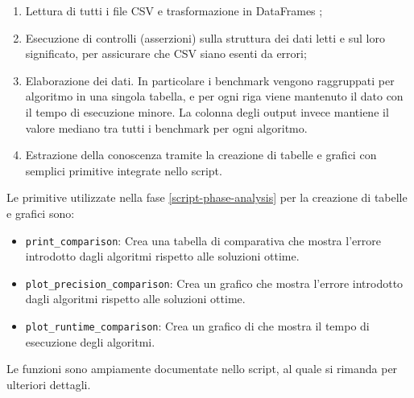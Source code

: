 \begin{enumerate}
    \item Lettura di tutti i file CSV e trasformazione in DataFrames ;
    \item Esecuzione di controlli (asserzioni) sulla struttura dei dati
      letti e sul loro significato, per assicurare che CSV siano esenti da errori;
    \item Elaborazione dei dati. In particolare i benchmark vengono raggruppati
      per algoritmo in una singola tabella, e per ogni riga
      viene mantenuto il dato con il tempo di esecuzione minore. La
      colonna degli output invece mantiene il valore mediano tra tutti
      i benchmark per ogni algoritmo.
    \item Estrazione della conoscenza tramite la creazione di tabelle
      e grafici con semplici primitive integrate nello script.
    \label{script-phase-analysis}
\end{enumerate}

\noindent Le primitive utilizzate nella fase
\ref{script-phase-analysis} per la creazione di tabelle e grafici
sono:

\begin{itemize}
    \item \texttt{print_comparison}: Crea una tabella di
      comparativa che mostra l'errore introdotto dagli algoritmi rispetto alle soluzioni ottime.

    \item \texttt{plot_precision_comparison}: Crea un
      grafico che mostra l'errore introdotto dagli algoritmi rispetto alle soluzioni ottime.

    \item \texttt{plot_runtime_comparison}: Crea un
      grafico di che mostra il tempo di esecuzione degli algoritmi.

\end{itemize}

\noindent Le funzioni sono ampiamente documentate nello script, al
quale si rimanda per ulteriori dettagli.
